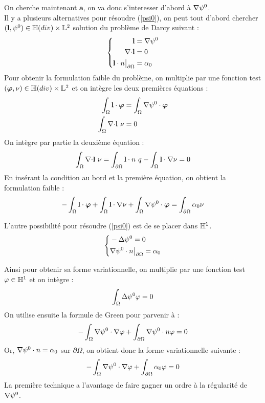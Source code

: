 On cherche maintenant $\mathbf{a}$, on va donc s'interesser d'abord à ${\nabla}\psi^0$.\\
Il y a plusieurs alternatives pour résoudre (\ref{psi0}), on peut tout d'abord chercher $(\mathbf{l},\psi^0)\in{\mathbb{H}}(div)\times{\mathbb{L}}^2$ solution du problème de Darcy suivant :
\begin{equation}
\label{pbpsidiv}
\left\{
\begin{aligned}
\mathbf{l} &= {\nabla} \psi^0\\
{\nabla\cdot} \mathbf{l} &= 0\\
\mathbf{l}\cdot n{\big\rvert_{\partial\Omega}} &= \alpha_0
\end{aligned}
\right.
\end{equation}
Pour obtenir la formulation faible du problème, on multiplie par une fonction test $(\bm{\varphi},\nu)\in{\mathbb{H}}(div)\times{\mathbb{L}}^2$ et on intègre les deux premières équations :
\begin{align*}
\int_\Omega \mathbf{l}\cdot\bm{\varphi} &= \int_\Omega {\nabla}\psi^0\cdot\bm{\varphi}\\
\int_\Omega {\nabla\cdot} \mathbf{l}\ \nu &= 0
\end{align*}
On intègre par partie la deuxième équation :
\[
\int_\Omega {\nabla\cdot} \mathbf{l}\ \nu = \int_{\partial\Omega} \mathbf{l}\cdot n\ q - \int_\Omega \mathbf{l}\cdot{\nabla}\nu = 0 
\]
En insérant la condition au bord et la première équation, on obtient la formulation faible :
\begin{equation}
\label{fvpsidiv}
-\int_\Omega \mathbf{l}\cdot\bm{\varphi} + \int_\Omega \mathbf{l}\cdot{\nabla}\nu + \int_\Omega {\nabla}\psi^0\cdot\bm{\varphi}  = \int_{\partial\Omega} \alpha_0\nu
\end{equation}

L'autre possibilité pour résoudre (\ref{psi0}) est de se placer dans ${\mathbb{H}}^1$. 
\begin{equation}
\label{pbpsi0}
\left\{
\begin{aligned}
&-{\Delta}\psi^0 = 0\\
&{\nabla}\psi^0\cdot n{\big\rvert_{\partial\Omega}}=\alpha_0
\end{aligned}
\right.
\end{equation}

Ainsi pour obtenir sa forme variationnelle, on multiplie par une fonction test $\varphi\in{\mathbb{H}}^1$ et on intègre :
\[
\int_\Omega {\Delta}\psi^0 \varphi = 0
\]
On utilise ensuite la formule de Green pour parvenir à :
\[
-\int_\Omega {\nabla}\psi^0\cdot{\nabla}\varphi + \int_{\partial\Omega} {\nabla}\psi^0\cdot n\varphi = 0
\]
Or, ${\nabla}\psi^0\cdot n = \alpha_0$ sur $\partial\Omega$, on obtient donc la forme variationnelle suivante :
\begin{equation}
\label{fvpsi0}
-\int_\Omega {\nabla}\psi^0\cdot{\nabla}\varphi + \int_{\partial\Omega} \alpha_0\varphi = 0
\end{equation}
La première technique a l'avantage de faire gagner un ordre à la régularité de ${\nabla}\psi^0$.\\

